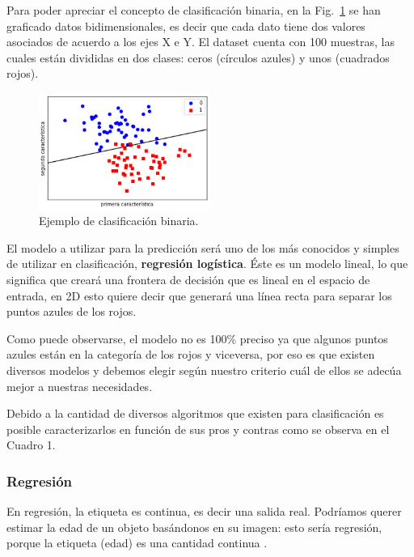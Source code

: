 \documentclass[a4paper,12pt]{article}
\begin{document}
Para poder apreciar el concepto de clasificación binaria, en la Fig.~\ref{fig:binaryclassification.}  \cite{GitHubpa25:online} se han graficado datos bidimensionales, es decir que cada dato tiene dos valores asociados de acuerdo a los ejes X e Y. El dataset cuenta con 100 muestras, las cuales están divididas en dos clases: ceros (círculos azules) y unos (cuadrados rojos). 

\begin{figure}[H]
	\begin{center}				
		\includegraphics[width=0.5\textwidth]{tesis_2.png}
		\caption{Ejemplo de clasificación binaria.}
		\label{fig:binaryclassification.}
	\end{center}
\end{figure}

El modelo a utilizar para la predicción será uno de los más conocidos y simples de utilizar en clasificación, \textbf{regresión logística}. Éste es un modelo lineal, lo que significa que creará una frontera de decisión que es lineal en el espacio de entrada, en 2D esto quiere decir que generará una línea recta para separar los puntos azules de los rojos.

Como puede observarse, el modelo no es 100\% preciso ya que algunos puntos azules están en la categoría de los rojos y viceversa, por eso es que existen diversos modelos y debemos elegir según nuestro criterio cuál de ellos se adecúa mejor a nuestras necesidades.

Debido a la cantidad de diversos algoritmos que existen para clasificación es posible caracterizarlos en función de sus pros y contras como se observa en el Cuadro 1.



\subsubsection{Regresión}

En regresión, la etiqueta es continua, es decir una salida real. Podríamos querer estimar la edad de un objeto basándonos en su imagen: esto sería regresión, porque la etiqueta (edad) es una cantidad continua \citep{GitHubpa25:online}.
\end{document}
